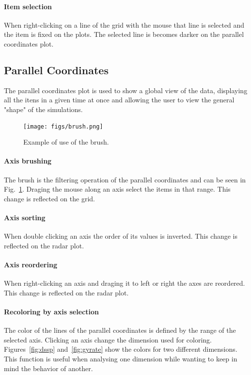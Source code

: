 \documentclass[10pt, conference]{IEEEtran}
\begin{document}
\paragraph*{Item selection} When right-clicking on a line of the grid with the mouse that line is selected and the item is fixed on the plots. The selected line is becomes darker on the parallel coordinates plot.

\subsection{Parallel Coordinates}

The parallel coordinates plot is used to show a global view of the data, displaying all the itens in a given time at once and allowing the user to view the general "shape" of the simulations.

\begin{figure}
\texttt{[image: figs/brush.png]}
\caption{Example of use of the brush.} 
\label{fig:brush}
\end{figure}
\paragraph*{Axis brushing} The brush is the filtering operation of the parallel coordinates and can be seen in Fig.~\ref{fig:brush}. Draging the mouse along an axis select the items in that range. This change is reflected on the grid.
\paragraph*{Axis sorting} When double clicking an axis the order of its values is inverted. This change is reflected on the radar plot.
\paragraph*{Axis reordering} When right-clicking an axis and draging it to left or right the axes are reordered. This change is reflected on the radar plot.
\paragraph*{Recoloring by axis selection} The color of the lines of the parallel coordinates is defined by the range of the selected axis. Clicking an axis change the dimension used for coloring. Figures~\ref{fig:dssp} and~\ref{fig:gyrate} show the colors for two different dimensions. This function is useful when analysing one dimension while wanting to keep in mind the behavior of another.
\end{document}
